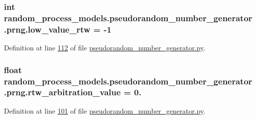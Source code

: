 \subsubsection[{low\+\_\+value\+\_\+rtw}]{\setlength{\rightskip}{0pt plus 5cm}int random\+\_\+process\+\_\+models.\+pseudorandom\+\_\+number\+\_\+generator.\+prng.\+low\+\_\+value\+\_\+rtw = -\/1\hspace{0.3cm}{\ttfamily [static]}}\label{classrandom__process__models_1_1pseudorandom__number__generator_1_1prng_adf3f03d77c73d020e031922b1e8ef1b4}


Definition at line \hyperlink{pseudorandom__number__generator_8py_source_l00112}{112} of file \hyperlink{pseudorandom__number__generator_8py_source}{pseudorandom\+\_\+number\+\_\+generator.\+py}.

\hypertarget{classrandom__process__models_1_1pseudorandom__number__generator_1_1prng_a90c8ad6b1e19cfb7a8e9eea3f2c16728}{}
\subsubsection[{rtw\+\_\+arbitration\+\_\+value}]{\setlength{\rightskip}{0pt plus 5cm}float random\+\_\+process\+\_\+models.\+pseudorandom\+\_\+number\+\_\+generator.\+prng.\+rtw\+\_\+arbitration\+\_\+value = 0.\hspace{0.3cm}{\ttfamily [static]}}\label{classrandom__process__models_1_1pseudorandom__number__generator_1_1prng_a90c8ad6b1e19cfb7a8e9eea3f2c16728}


Definition at line \hyperlink{pseudorandom__number__generator_8py_source_l00101}{101} of file \hyperlink{pseudorandom__number__generator_8py_source}{pseudorandom\+\_\+number\+\_\+generator.\+py}.

\hypertarget{classrandom__process__models_1_1pseudorandom__number__generator_1_1prng_a6962172d81af8d6c172ba64e33eb0d55}{}
